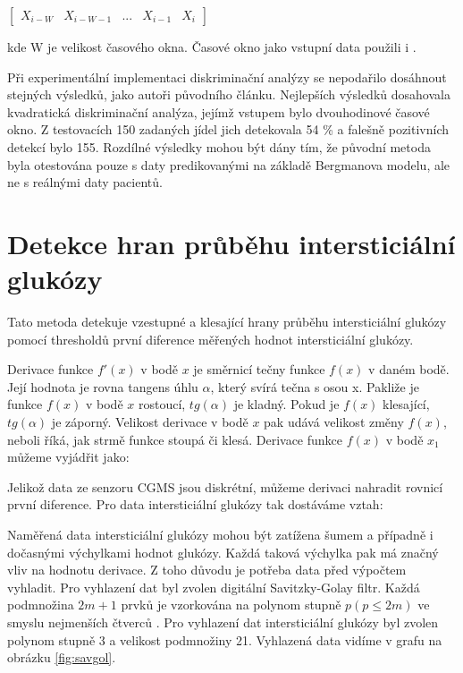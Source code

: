 $\begin{bmatrix}
X_{i-W} & X_{i-W-1} & ... & X_{i-1} & X_{i}
\end{bmatrix}$

\noindent kde W je velikost časového okna. Časové okno jako vstupní data použili i \citet{analyzaCHO.LDA}.

Při experimentální implementaci diskriminační analýzy se nepodařilo dosáhnout stejných výsledků, jako autoři původního článku. Nejlepších výsledků dosahovala kvadratická diskriminační analýza, jejímž vstupem bylo dvouhodinové časové okno. Z testovacích 150 zadaných jídel jich detekovala 54 \% a falešně pozitivních detekcí bylo 155. Rozdílné výsledky mohou být dány tím, že původní metoda byla otestována pouze s daty predikovanými na základě Bergmanova modelu, ale ne s reálnými daty pacientů.

\section{Detekce hran průběhu intersticiální glukózy}
\label{ch:threshold}

Tato metoda detekuje vzestupné a klesající hrany průběhu intersticiální glukózy pomocí thresholdů první diference měřených hodnot intersticiální glukózy.

Derivace funkce $f'(x)$ v bodě $x$ je směrnicí tečny funkce $f(x)$ v daném bodě. Její hodnota je rovna tangens úhlu $\alpha$, který svírá tečna s osou x. Pakliže je funkce $f(x)$ v bodě $x$ rostoucí, $tg(\alpha)$ je kladný. Pokud je $f(x)$ klesající, $tg(\alpha)$ je záporný. Velikost derivace v bodě $x$ pak udává velikost změny $f(x)$, neboli říká, jak strmě funkce stoupá či klesá. Derivace funkce $f(x)$ v bodě $x_{1}$ můžeme vyjádřit jako:


Jelikož data ze senzoru CGMS jsou diskrétní, můžeme derivaci nahradit rovnicí první diference. Pro data intersticiální glukózy tak dostáváme vztah:


Naměřená data intersticiální glukózy mohou být zatížena šumem a případně i dočasnými výchylkami hodnot glukózy. Každá taková výchylka pak má značný vliv na hodnotu derivace. Z toho důvodu je potřeba data před výpočtem vyhladit. Pro vyhlazení dat byl zvolen digitální Savitzky-Golay filtr. Každá podmnožina $2m+1$ prvků je vzorkována na polynom stupně $p (p\leq 2m)$ ve smyslu nejmenších čtverců \citep{cho.savgol}. Pro vyhlazení dat intersticiální glukózy byl zvolen polynom stupně 3 a velikost podmnožiny 21. Vyhlazená data vidíme v grafu na obrázku \ref{fig:savgol}.

